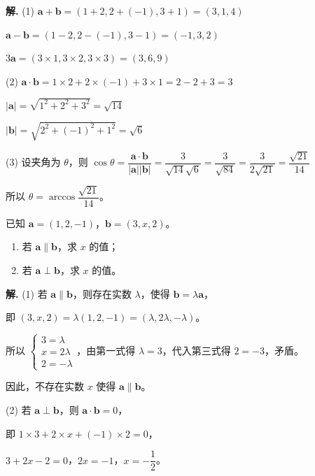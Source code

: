 \documentclass[11pt]{ctexrep}
\begin{document}
\textbf{解.} (1) $\boldsymbol{a} + \boldsymbol{b} = (1+2, 2+(-1), 3+1) = (3, 1, 4)$

$\boldsymbol{a} - \boldsymbol{b} = (1-2, 2-(-1), 3-1) = (-1, 3, 2)$

$3\boldsymbol{a} = (3 \times 1, 3 \times 2, 3 \times 3) = (3, 6, 9)$

(2) $\boldsymbol{a} \cdot \boldsymbol{b} = 1 \times 2 + 2 \times (-1) + 3 \times 1 = 2 - 2 + 3 = 3$

$|\boldsymbol{a}| = \sqrt{1^2 + 2^2 + 3^2} = \sqrt{14}$

$|\boldsymbol{b}| = \sqrt{2^2 + (-1)^2 + 1^2} = \sqrt{6}$

(3) 设夹角为 $\theta$，则 $\cos\theta = \dfrac{\boldsymbol{a} \cdot \boldsymbol{b}}{|\boldsymbol{a}||\boldsymbol{b}|} = \dfrac{3}{\sqrt{14}\sqrt{6}} = \dfrac{3}{\sqrt{84}} = \dfrac{3}{2\sqrt{21}} = \dfrac{\sqrt{21}}{14}$

所以 $\theta = \arccos\dfrac{\sqrt{21}}{14}$。

\begin{example}[向量的平行与垂直]
    已知 $\boldsymbol{a} = (1, 2, -1)$，$\boldsymbol{b} = (3, x, 2)$。
    \begin{enumerate}
        \item 若 $\boldsymbol{a} \parallel \boldsymbol{b}$，求 $x$ 的值；
        \item 若 $\boldsymbol{a} \perp \boldsymbol{b}$，求 $x$ 的值。
    \end{enumerate}
\end{example}

\textbf{解.} (1) 若 $\boldsymbol{a} \parallel \boldsymbol{b}$，则存在实数 $\lambda$，使得 $\boldsymbol{b} = \lambda\boldsymbol{a}$，

即 $(3, x, 2) = \lambda(1, 2, -1) = (\lambda, 2\lambda, -\lambda)$。

所以 $\begin{cases} 3 = \lambda \\ x = 2\lambda \\ 2 = -\lambda \end{cases}$，由第一式得 $\lambda = 3$，代入第三式得 $2 = -3$，矛盾。

因此，不存在实数 $x$ 使得 $\boldsymbol{a} \parallel \boldsymbol{b}$。

(2) 若 $\boldsymbol{a} \perp \boldsymbol{b}$，则 $\boldsymbol{a} \cdot \boldsymbol{b} = 0$，

即 $1 \times 3 + 2 \times x + (-1) \times 2 = 0$，

$3 + 2x - 2 = 0$，$2x = -1$，$x = -\dfrac{1}{2}$。
\end{document}
